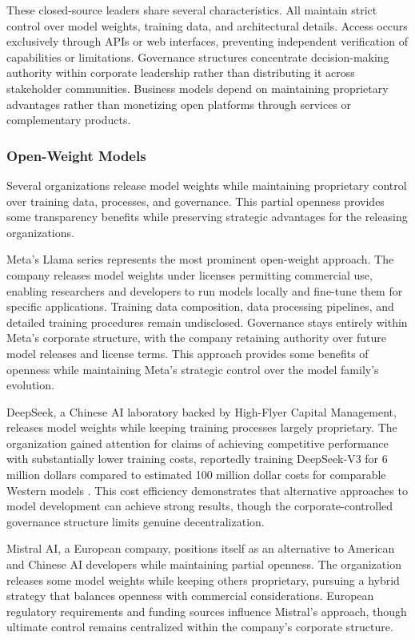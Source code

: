 These closed-source leaders share several characteristics. All maintain strict control over model weights, training data, and architectural details. Access occurs exclusively through APIs or web interfaces, preventing independent verification of capabilities or limitations. Governance structures concentrate decision-making authority within corporate leadership rather than distributing it across stakeholder communities. Business models depend on maintaining proprietary advantages rather than monetizing open platforms through services or complementary products.

\subsubsection{Open-Weight Models}

Several organizations release model weights while maintaining proprietary control over training data, processes, and governance. This partial openness provides some transparency benefits while preserving strategic advantages for the releasing organizations.

Meta's Llama series represents the most prominent open-weight approach. The company releases model weights under licenses permitting commercial use, enabling researchers and developers to run models locally and fine-tune them for specific applications. Training data composition, data processing pipelines, and detailed training procedures remain undisclosed. Governance stays entirely within Meta's corporate structure, with the company retaining authority over future model releases and license terms. This approach provides some benefits of openness while maintaining Meta's strategic control over the model family's evolution.

DeepSeek, a Chinese AI laboratory backed by High-Flyer Capital Management, releases model weights while keeping training processes largely proprietary. The organization gained attention for claims of achieving competitive performance with substantially lower training costs, reportedly training DeepSeek-V3 for 6 million dollars compared to estimated 100 million dollar costs for comparable Western models \cite{deepseek_wikipedia2025, deepseek_carnegie2025}. This cost efficiency demonstrates that alternative approaches to model development can achieve strong results, though the corporate-controlled governance structure limits genuine decentralization.

Mistral AI, a European company, positions itself as an alternative to American and Chinese AI developers while maintaining partial openness. The organization releases some model weights while keeping others proprietary, pursuing a hybrid strategy that balances openness with commercial considerations. European regulatory requirements and funding sources influence Mistral's approach, though ultimate control remains centralized within the company's corporate structure.

